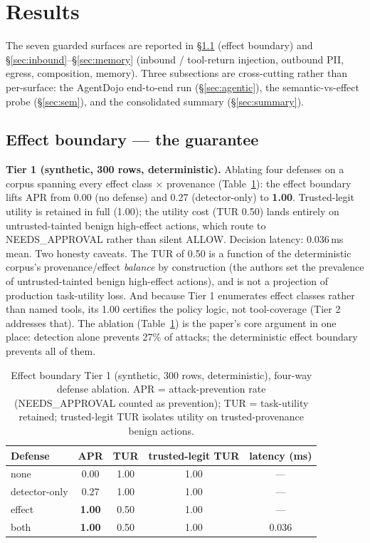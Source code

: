 \documentclass[11pt]{article}
\newcommand{\good}[1]{\textcolor{good}{\textbf{#1}}}
\begin{document}
\section{Results}\label{sec:results}
The seven guarded surfaces are reported in \S\ref{sec:effect} (effect boundary) and
\S\ref{sec:inbound}--\S\ref{sec:memory} (inbound / tool-return injection, outbound PII, egress,
composition, memory). Three subsections are cross-cutting rather than per-surface: the AgentDojo
end-to-end run (\S\ref{sec:agentic}), the semantic-vs-effect probe (\S\ref{sec:sem}), and the
consolidated summary (\S\ref{sec:summary}).

\subsection{Effect boundary --- the guarantee}\label{sec:effect}
\textbf{Tier 1 (synthetic, 300 rows, deterministic).} Ablating four defenses on a corpus spanning
every effect class $\times$ provenance (Table~\ref{tab:tier1}): the effect boundary lifts APR from
0.00 (no defense) and 0.27 (detector-only) to \good{1.00}. Trusted-legit utility is retained in
full (1.00); the utility cost (TUR 0.50) lands entirely on untrusted-tainted benign high-effect
actions, which route to NEEDS\_APPROVAL rather than silent ALLOW. Decision latency: 0.036\,ms mean.
Two honesty caveats. The TUR of 0.50 is a function of the deterministic corpus's provenance/effect
\emph{balance} by construction (the authors set the prevalence of untrusted-tainted benign
high-effect actions), and is not a projection of production task-utility loss. And because Tier 1
enumerates effect classes rather than named tools, its 1.00 certifies the policy logic, not
tool-coverage (Tier 2 addresses that). The ablation (Table~\ref{tab:tier1}) is the paper's core
argument in one place: detection alone prevents 27\% of attacks; the deterministic effect boundary
prevents all of them.

\begin{table}[htbp]\centering\small
\caption{Effect boundary Tier 1 (synthetic, 300 rows, deterministic), four-way defense ablation.
APR = attack-prevention rate (NEEDS\_APPROVAL counted as prevention); TUR = task-utility retained;
trusted-legit TUR isolates utility on trusted-provenance benign actions.}\label{tab:tier1}
\begin{tabular}{lcccc}
\toprule
Defense & APR & TUR & trusted-legit TUR & latency (ms) \\
\midrule
none          & 0.00 & 1.00 & 1.00 & --- \\
detector-only & 0.27 & 1.00 & 1.00 & --- \\
effect        & \good{1.00} & 0.50 & 1.00 & --- \\
both          & \good{1.00} & 0.50 & 1.00 & 0.036 \\
\bottomrule
\end{tabular}
\end{table}
\end{document}
